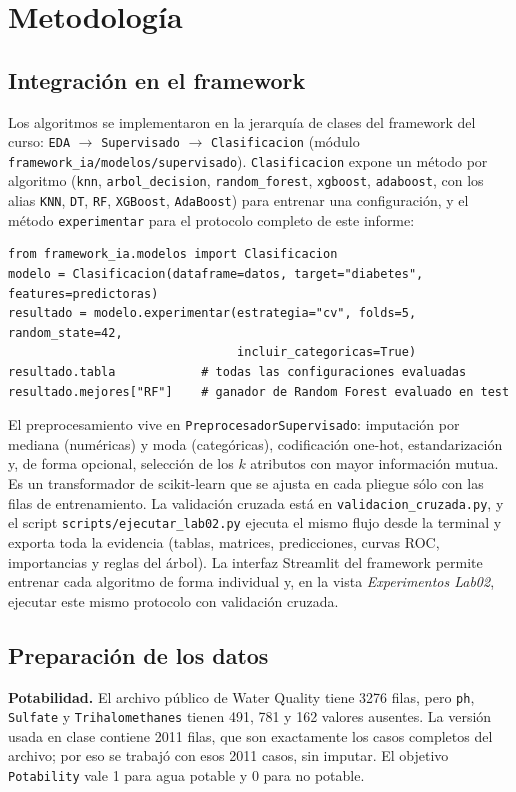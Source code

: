 \documentclass[11pt]{article}
\begin{document}
\clearpage

\section{Metodología}

\subsection{Integración en el framework}
Los algoritmos se implementaron en la jerarquía de clases del framework del curso:
\texttt{EDA} $\rightarrow$ \texttt{Supervisado} $\rightarrow$ \texttt{Clasificacion}
(módulo \texttt{framework\_ia/modelos/supervisado}). \texttt{Clasificacion} expone un
método por algoritmo (\texttt{knn}, \texttt{arbol\_decision}, \texttt{random\_forest},
\texttt{xgboost}, \texttt{adaboost}, con los alias \texttt{KNN}, \texttt{DT},
\texttt{RF}, \texttt{XGBoost}, \texttt{AdaBoost}) para entrenar una configuración, y el
método \texttt{experimentar} para el protocolo completo de este informe:

\begin{verbatim}
from framework_ia.modelos import Clasificacion
modelo = Clasificacion(dataframe=datos, target="diabetes", features=predictoras)
resultado = modelo.experimentar(estrategia="cv", folds=5, random_state=42,
                                incluir_categoricas=True)
resultado.tabla            # todas las configuraciones evaluadas
resultado.mejores["RF"]    # ganador de Random Forest evaluado en test
\end{verbatim}

El preprocesamiento vive en \texttt{PreprocesadorSupervisado}: imputación por mediana
(numéricas) y moda (categóricas), codificación one-hot, estandarización y, de forma
opcional, selección de los $k$ atributos con mayor información mutua. Es un
transformador de scikit-learn \cite{pedregosa} que se ajusta en cada pliegue sólo con
las filas de entrenamiento. La validación cruzada está en
\texttt{validacion\_cruzada.py}, y el script \texttt{scripts/ejecutar\_lab02.py} ejecuta
el mismo flujo desde la terminal y exporta toda la evidencia (tablas, matrices,
predicciones, curvas ROC, importancias y reglas del árbol). La interfaz Streamlit del
framework permite entrenar cada algoritmo de forma individual y, en la vista
\emph{Experimentos Lab02}, ejecutar este mismo protocolo con validación cruzada.

\subsection{Preparación de los datos}
\textbf{Potabilidad.} El archivo público de Water Quality \cite{datospotabilidad} tiene
3276 filas, pero \texttt{ph}, \texttt{Sulfate} y \texttt{Trihalomethanes} tienen 491,
781 y 162 valores ausentes. La versión usada en clase contiene 2011 filas, que son
exactamente los casos completos del archivo; por eso se trabajó con esos 2011 casos,
sin imputar. El objetivo \texttt{Potability} vale 1 para agua potable y 0 para no potable.
\end{document}
